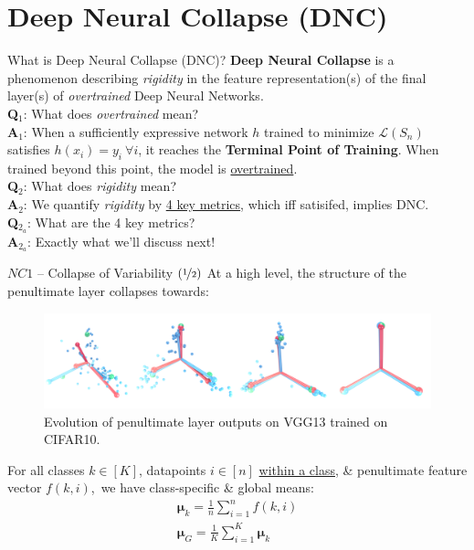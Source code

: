 \documentclass{beamer}
\begin{document}
\section{Deep Neural Collapse (DNC)}
\begin{frame}{What is Deep Neural Collapse (DNC)?}
	\textbf{Deep Neural Collapse} is a phenomenon describing \textit{rigidity} in the feature representation(s) of the final layer(s) of \textit{overtrained} Deep Neural Networks. \pause \newline \\

	\textbf{Q${}_1$}: What does \textit{overtrained} mean? \\
	\textbf{A${}_1$}: When a sufficiently expressive network $h$ trained to minimize $\mathcal{L}(S_n)$ satisfies $h(x_i) = y_i\ \forall i$, it reaches the \textbf{Terminal Point of Training}. When trained beyond this point, the model is  \underline{overtrained}. \pause \newline \\

	\textbf{Q${}_2$}: What does \textit{rigidity} mean? \\
	\textbf{A${}_2$}: We quantify \textit{rigidity} by \underline{4 key metrics}, which iff satisifed, implies DNC. \pause \newline \\

	\textbf{Q${}_{2_a}$}: What are the 4 key metrics? \\
	\textbf{A${}_{2_a}$}: Exactly what we'll discuss next!
\end{frame}

\begin{frame}{$NC1$ -- Collapse of Variability $(\nicefrac{1}{2})$}
	At a high level, the structure of the penultimate layer collapses towards:
	\begin{figure}[H]
		\includegraphics[width=\textwidth]{img/nc.png}
		\small Evolution of penultimate layer outputs on VGG13 trained on CIFAR10.
	\end{figure} \pause
	
	For all classes $k \in [K]$, datapoints $i \in [n]$ \underline{within a class}, \& penultimate feature vector $f(k, i)$,\pause~we have class-specific \& global means:
	\begin{gather}
		\bm{\mu}_k = \frac{1}{n} \sum^n_{i=1} f(k, i) \\
		\bm{\mu}_G = \frac{1}{K} \sum^K_{i=1} \bm{\mu}_k
	\end{gather}
\end{frame}
	
\end{document}
